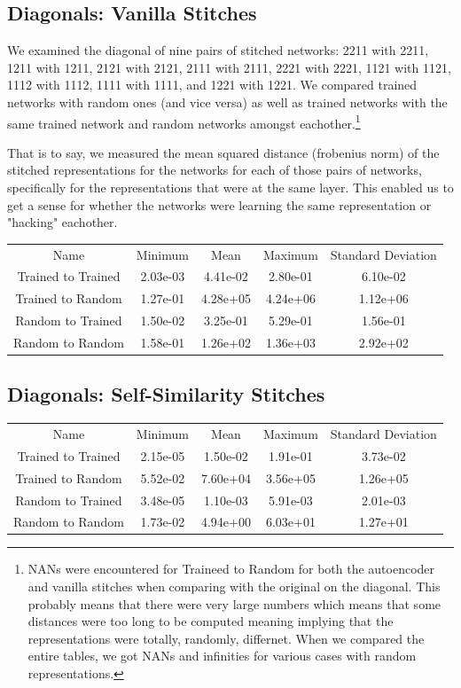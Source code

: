 \documentclass{article} %
\begin{document}
\subsection*{Diagonals: Vanilla Stitches}
We examined the diagonal of nine pairs of stitched networks: 2211 with 2211, 1211 with 1211, 
2121 with 2121, 2111 with 2111, 2221 with 2221, 1121 with 1121, 1112 with 1112, 1111 with 1111, 
and 1221 with 1221. We compared trained networks with random ones (and vice versa) as well as trained
networks with the same trained network and random networks amongst eachother.\footnote{NANs were encountered for 
Traineed to Random for both the autoencoder and vanilla stitches when comparing with the original on the diagonal.
This probably means  that there were
very large numbers which means that some distances were too long to be computed meaning implying that
the representations were totally, randomly, differnet. When we compared the entire tables, we got NANs and infinities
for various cases with random representations.}

That is to say, we measured the mean squared distance (frobenius norm) of the stitched representations for the networks
for each of those pairs of networks, specifically for the representations that were at the same layer. This enabled us
to get a sense for whether the networks were learning the same representation or "hacking" eachother.

\begin{tabular}{c c c c c}
   Name&Minimum&Mean&Maximum&Standard Deviation\\
   Trained to Trained&2.03e-03&4.41e-02&2.80e-01&6.10e-02\\
   Trained to Random&1.27e-01&4.28e+05&4.24e+06&1.12e+06\\
   Random to Trained&1.50e-02&3.25e-01&5.29e-01&1.56e-01\\
   Random to Random&1.58e-01&1.26e+02&1.36e+03&2.92e+02\\
\end{tabular}
   
   
\subsection*{Diagonals: Self-Similarity Stitches}
\begin{tabular}{c c c c c}
   Name&Minimum&Mean&Maximum&Standard Deviation\\
   Trained to Trained&2.15e-05&1.50e-02&1.91e-01&3.73e-02\\
   Trained to Random&5.52e-02&7.60e+04&3.56e+05&1.26e+05\\
   Random to Trained&3.48e-05&1.10e-03&5.91e-03&2.01e-03\\
   Random to Random&1.73e-02&4.94e+00&6.03e+01&1.27e+01\\
\end{tabular}
\end{document}
